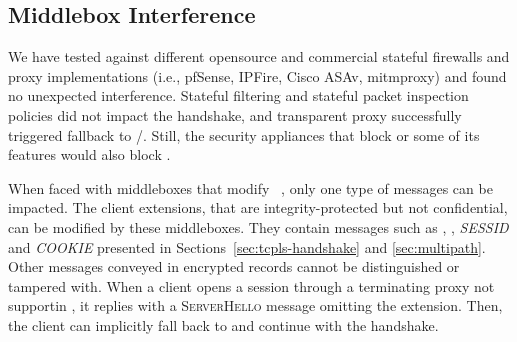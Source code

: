 

\subsection{Middlebox Interference}
\label{sec:middlebox}

We have tested \tcpls against different opensource and commercial 
stateful
firewalls and proxy implementations (i.e., pfSense, IPFire, Cisco ASAv,
mitmproxy) and found no unexpected interference. Stateful filtering and stateful
packet inspection policies did not impact the \tcpls handshake, and transparent 
\tls
proxy successfully triggered \tcpls fallback to \tls/\tcp. Still, the security
appliances that block  or some of its features
\cite{lee2019matls,Bock_China,raman2020measuring} would also block \tcpls.

When faced with middleboxes that modify ~\cite{Bock_China,raman2020measuring}, only one type of \tcpls 
messages can be impacted. The client \tls extensions, that are 
integrity-protected but not confidential, can be modified by these middleboxes. 
They contain messages such as \hello, \join, \textit{SESSID} and 
\textit{COOKIE} presented 
in Sections~\ref{sec:tcpls-handshake} and \ref{sec:multipath}. Other messages 
conveyed in encrypted \tls records cannot be distinguished or tampered with.
When a client opens a \tcpls session
through a \tls terminating proxy not supportin \tcpls, it replies 
with 
a \textsc{ServerHello} message omitting the \hello extension. Then, the client 
can implicitly fall back to \tls and continue with the handshake.

